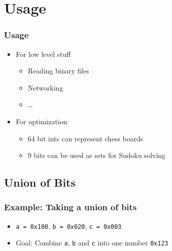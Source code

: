 \section{Usage}
\frame{\tableofcontents[currentsection]}

\begin{frame}
  \frametitle{Usage}
  \begin{itemize}
    \item For low level stuff
          \begin{itemize}
            \item Reading binary files
            \item Networking
            \item \dots
          \end{itemize}
    \item For optimization
          \begin{itemize}
            \item 64 bit ints can represent chess boards
            \item 9 bits can be used as sets for Sudoku solving
          \end{itemize}
  \end{itemize}
\end{frame}

\subsection{Union of Bits}
\frame{\tableofcontents[currentsubsection]}

\begin{frame}
  \frametitle{Example: Taking a union of bits}
  \begin{itemize}
    \item \texttt{a = 0x100}, \texttt{b = 0x020}, \texttt{c = 0x003}
    \item Goal: Combine \texttt{a}, \texttt{b} and \texttt{c} into one number \texttt{0x123}
  \end{itemize}
\end{frame}

